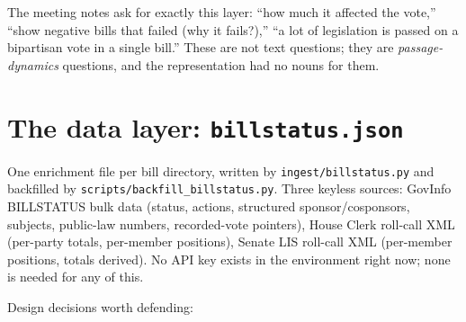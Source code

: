 \documentclass[11pt]{article}
\newcommand{\code}[1]{\texttt{#1}}
\begin{document}
The meeting notes ask for exactly this layer: ``how much it affected the
vote,'' ``show negative bills that failed (why it fails?),'' ``a lot of
legislation is passed on a bipartisan vote in a single bill.'' These are not
text questions; they are \emph{passage-dynamics} questions, and the
representation had no nouns for them.

\section{The data layer: \code{billstatus.json}}

One enrichment file per bill directory, written by \code{ingest/billstatus.py}
and backfilled by \code{scripts/backfill\_billstatus.py}. Three keyless
sources: GovInfo BILLSTATUS bulk data (status, actions, structured
sponsor/cosponsors, subjects, public-law numbers, recorded-vote pointers),
House Clerk roll-call XML (per-party totals, per-member positions), Senate
LIS roll-call XML (per-member positions, totals derived). No API key exists
in the environment right now; none is needed for any of this.

Design decisions worth defending:
\end{document}
